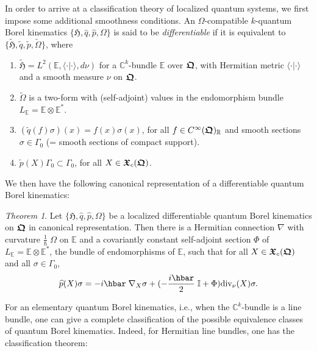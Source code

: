 \documentclass[12pt]{amsart}
\numberwithin{equation}{section}
\theoremstyle{remark}
\newcommand\HH{\mathfrak H}
\newcommand\RR{\mathbb R}
\newtheorem{theorem}[defi]{Theorem}
\newcommand{\betheo}{\begin{theorem}}
\newcommand{\entheo}{\end{theorem}}
\newcommand{\be}{\begin{equation}}
\newcommand{\en}{\end{equation}}
\newcommand{\htil}{\widetilde{\mathfrak H}}
\newcommand{\bfrakQ}{\mbox{\boldmath $\mathfrak Q$}}
\newcommand{\bfrakX}{\mbox{\boldmath $\mathfrak X$}}
\newcommand{\CinfRQ}{C^\infty(\bfrakQ)_{\RR}}
\begin{document}
In order to arrive at a classification theory of localized quantum systems, we
first impose some additional smoothness conditions. An $\Omega$-compatible
$k$-quantum Borel kinematics $\{ \HH , \widehat{q}, \widehat{p}, \Omega\}$ is
said to be {\em differentiable} if it is equivalent to $\{\htil, \widetilde{q},
\widetilde{p}, \widetilde{\Omega}\}$, where

\begin{enumerate}

\item $\htil = L^2 (\mathbb E , \langle\cdot\vert\cdot\rangle , d\nu )$ for a
      ${\mathbb C}^k$-bundle $\mathbb E$ over $\bfrakQ$, with Hermitian metric
      $\langle\cdot\vert\cdot\rangle$ and a smooth measure $\nu$ on $\bfrakQ$.

\item $\widetilde{\Omega}$ is a two-form with (self-adjoint) values in the
      endomorphism bundle $L_{\mathbb E} = {\mathbb E}\otimes {\mathbb E}^*$.

\item $(\widetilde{q}(f)\sigma )(x) = f(x)\sigma (x)$, for all $f \in
      \CinfRQ$ and smooth sections $\sigma \in \Gamma_0$
      (= smooth sections of compact support).

\item $\widetilde{p} (X)\Gamma_0 \subset \Gamma_0$, for all $X \in \bfrakX_c
      (\bfrakQ )$.

\end{enumerate}

We then have the following canonical representation of a differentiable quantum
Borel kinematics:

\betheo
Let $\{ \HH , \widehat{q}, \widehat{p}, \Omega\}$ be a localized differentiable
quantum Borel kinematics on $\bfrakQ$ in canonical representation. Then there
is a Hermitian connection $\nabla$ with curvature ${\displaystyle \frac
1\hbar}\;\Omega$ on $\mathbb E$ and a covariantly constant self-adjoint section
$\Phi$ of $L_{\mathbb E} = {\mathbb E}\otimes {\mathbb E}^*$, the bundle of
endomorphisms of $\mathbb E$, such that for all $X \in \bfrakX_c (\bfrakQ )$
and all $\sigma \in \Gamma_0$,
\be
\widehat{p}(X)\sigma = -i\hbar\;\nabla_X\sigma
    + (-\frac {i\hbar}2\;\mathbb I + \Phi )
    \mbox{\rm div}_\nu (X)\sigma .
\label{diffquant}
\en
\entheo


For an elementary quantum Borel kinematics, i.e., when the
${\mathbb C}^k$-bundle is a line bundle, one can give a complete classification
of the possible equivalence classes of quantum Borel kinematics. Indeed, for
Hermitian line bundles, one has the classification theorem:
\end{document}
